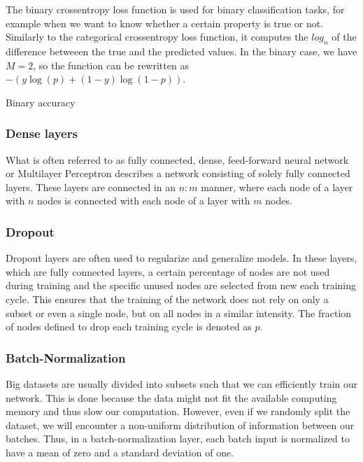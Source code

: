 The binary crossentropy loss function is used for binary classification tasks, for example when we want to know whether a certain property is true or not. Similarly to the categorical crossentropy loss function, it computes the $log_{n}$ of the difference betweeen the true and the predicted values. In the binary case, we have $M=2$, so the function can be rewritten as $-{(y\log(p) + (1 - y)\log(1 - p))}$.

Binary accuracy

 
 
\subsubsection{Dense layers}
What is often referred to as fully connected, dense, feed-forward neural network or Multilayer Perceptron describes a network consisting of solely fully connected layers. These layers are connected in an $n:m$ manner, where each node of a layer with $n$ nodes is connected with each node of a layer with $m$ nodes. 

\subsubsection{Dropout}
Dropout layers are often used to regularize and generalize models. In these layers, which are fully connected layers, a certain percentage of nodes are not used during training and the specific unused nodes are selected from new each training cycle. This ensures that the training of the network does not rely on only a subset or even a single node, but on all nodes in a similar intensity. The fraction of nodes defined to drop each training cycle is denoted as $p$.

\subsubsection{Batch-Normalization}
Big datasets are usually divided into subsets such that we can efficiently train our network. This is done because the data might not fit the available computing memory and thus slow our computation. However, even if we randomly split the dataset, we will encounter a non-uniform distribution of information between our batches. Thus, in a batch-normalization layer, each batch input is normalized to have a mean of zero and a standard deviation of one. 

